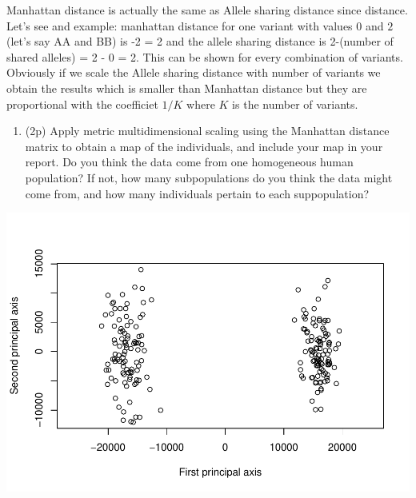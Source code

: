 \documentclass[
]{article}
\newenvironment{Shaded}{\begin{snugshade}}{\end{snugshade}}
\newcommand{\DataTypeTok}[1]{\textcolor[rgb]{0.13,0.29,0.53}{#1}}
\newcommand{\DecValTok}[1]{\textcolor[rgb]{0.00,0.00,0.81}{#1}}
\newcommand{\KeywordTok}[1]{\textcolor[rgb]{0.13,0.29,0.53}{\textbf{#1}}}
\newcommand{\NormalTok}[1]{#1}
\newcommand{\OperatorTok}[1]{\textcolor[rgb]{0.81,0.36,0.00}{\textbf{#1}}}
\newcommand{\OtherTok}[1]{\textcolor[rgb]{0.56,0.35,0.01}{#1}}
\newcommand{\StringTok}[1]{\textcolor[rgb]{0.31,0.60,0.02}{#1}}
\providecommand{\tightlist}{%
  \setlength{\itemsep}{0pt}\setlength{\parskip}{0pt}}
\begin{document}
Manhattan distance is actually the same as Allele sharing distance since
distance. Let's see and example: manhattan distance for one variant with
values \(0\) and \(2\) (let's say AA and BB) is -2\textbar{} =
2 and the allele sharing distance is 2-(number of shared alleles) = 2 -
0 = 2. This can be shown for every combination of variants. Obviously if
we scale the Allele sharing distance with number of variants we obtain
the results which is smaller than Manhattan distance but they are
proportional with the coefficiet \(1/K\) where \(K\) is the number of
variants.

\begin{enumerate}
\def\labelenumi{\arabic{enumi}.}
\setcounter{enumi}{3}
\tightlist
\item
  (2p) Apply metric multidimensional scaling using the Manhattan
  distance matrix to obtain a map of the individuals, and include your
  map in your report. Do you think the data come from one homogeneous
  human population? If not, how many subpopulations do you think the
  data might come from, and how many individuals pertain to each
  suppopulation?
\end{enumerate}

\begin{Shaded}
\end{Shaded}

\includegraphics{P052020_Substructure_files/figure-latex/4th-1.pdf}
\end{document}
